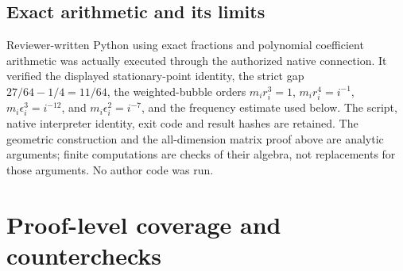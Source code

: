 \documentclass[10pt]{article}
\begin{document}
\subsection*{Exact arithmetic and its limits}
Reviewer-written Python using exact fractions and polynomial coefficient arithmetic was actually executed through the authorized native connection. It verified the displayed stationary-point identity, the strict gap \(27/64-1/4=11/64\), the weighted-bubble orders \(m_ir_i^3=1\), \(m_ir_i^4=i^{-1}\), \(m_i\epsilon_i^3=i^{-12}\), and \(m_i\epsilon_i^2=i^{-7}\), and the frequency estimate used below. The script, native interpreter identity, exit code and result hashes are retained. The geometric construction and the all-dimension matrix proof above are analytic arguments; finite computations are checks of their algebra, not replacements for those arguments. No author code was run.\par
\section*{Proof-level coverage and counterchecks}
\end{document}
